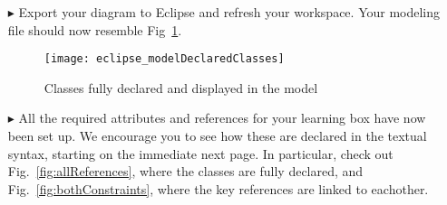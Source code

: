 \begin{itemize}
\vspace{1cm}

\item[$\blacktriangleright$] Export your diagram to Eclipse and refresh your workspace. Your modeling file should now resemble Fig~\ref{fig:model_allClasses}.

\vspace{1cm}

\begin{figure}[htbp]
	\centering
  \texttt{[image: eclipse\_modelDeclaredClasses]}
	\caption{Classes fully declared and displayed in the model}
	\label{fig:model_allClasses}
\end{figure}

\vspace{1cm}

\item[$\blacktriangleright$] All the required attributes and references for your learning box have now been set up. We encourage you to see how these are
declared in the textual syntax, starting on the immediate next page. In particular, check out Fig.~\ref{fig:allReferences}, where the classes are fully declared, and Fig.~\ref{fig:bothConstraints}, where the key references are linked to eachother.


\end{itemize}
